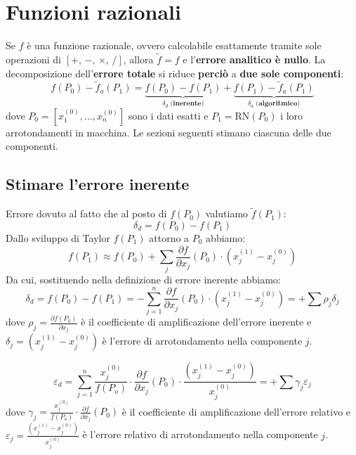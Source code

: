 \documentclass[12pt,a4paper,]{report}
\begin{document}
\section{Funzioni razionali}
Se $f$ è una funzione razionale, ovvero calcolabile esattamente tramite sole operazioni di $[+,\,-,\,\times,\,/]$, allora $\tilde{f} = f$ e l'\textbf{errore analitico è nullo}. La decomposizione dell'\textbf{errore totale} si riduce \textbf{perciò} a \textbf{due sole componenti}:
\[
    f(P_0) - \tilde{f}_a(P_1)
    = \underbrace{f(P_0) - f(P_1)}_{\delta_d\;\textbf{(inerente)}}
    + \underbrace{f(P_1) - \tilde{f}_a(P_1)}_{\delta_a\;\textbf{(algoritmico)}}
\]
dove $P_0 = [x_1^{(0)},\dots,x_n^{(0)}]$ sono i dati esatti e
$P_1 = \mathrm{RN}(P_0)$ i loro arrotondamenti in macchina.
Le sezioni seguenti stimano ciascuna delle due componenti.

\subsection{Stimare l'errore inerente}
\begin{definizione}
    Errore dovuto al fatto che al posto di $f(P_0)$ valutiamo $\tilde{f}(P_1)$:
    \[
    \delta_d = f(P_0) - f(P_1)
    \]
    Dallo sviluppo di Taylor $f(P_1)$ attorno a $P_0$ abbiamo:
    \[
    f(P_1) \approx f(P_0) + \sum_j \frac{\partial f}{\partial x_j}(P_0)\cdot(x_j^{(1)}-x_j^{(0)})
    \]
    Da cui, sostituendo nella definizione di errore inerente abbiamo:
    \[
    \boxed{\delta_d =} f(P_0) - f(P_1) = \boxed{- \sum_{j=1}^n \frac{\partial f}{\partial x_j} (P_0) \cdot  (x_j^{(1)} - x_j^{(0)})} = +\sum \rho_j \delta_j
    \]
    dove $\rho_j = \frac{\partial f(P_0)}{\partial x_j} $ è il coefficiente di amplificazione dell'errore inerente e $\delta_j = (x_j^{(1)} - x_j^{(0)})$ è l'errore di arrotondamento nella componente $j$.
\end{definizione}
\begin{definizione}
    \[
    \boxed{\varepsilon_d = \sum_{j=1}^n \frac{x_j^{(0)}}{f(P_o)}\cdot \frac{\partial f}{\partial x_j} (P_0) \cdot \frac{(x_j^{(1)} - x_j^{(0)})}{x_j^{(0)}}}  = +\sum \gamma_j \varepsilon_j
    \]
    dove $\gamma_j = \frac{x_j^{(0)}}{f(P_o)}\cdot \frac{\partial f}{\partial x_j} (P_0) $ è il coefficiente di amplificazione dell'errore relativo e $ \varepsilon_j = \frac{(x_j^{(1)} - x_j^{(0)})}{x_j^{(0)}}$ è l'errore relativo di arrotondamento nella componente $j$.
\end{definizione}
\end{document}
